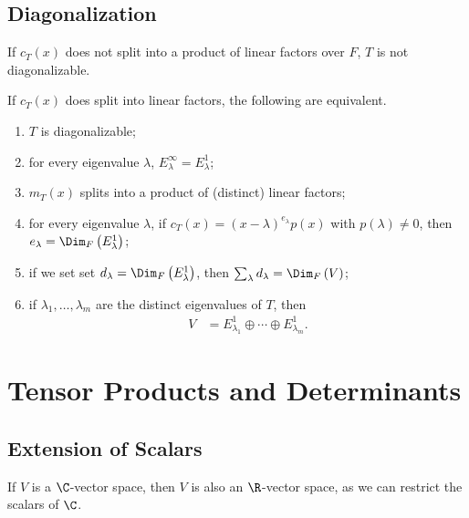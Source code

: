 \documentclass[10pt]{mypackage}
\begin{document}
\subsection{Diagonalization}%
\begin{theorem}
  If $c_T(x)$ does not split into a product of linear factors over $F$, $T$ is not diagonalizable.\newline

  If $c_T(x)$ does split into linear factors, the following are equivalent.
  \begin{enumerate}[(1)]
    \item $T$ is diagonalizable;
    \item for every eigenvalue $\lambda$, $E_{\lambda}^{\infty} = E_{\lambda}^{1}$;
    \item $m_{T}(x)$ splits into a product of (distinct) linear factors;
    \item for every eigenvalue $\lambda$, if $c_T(x) = \left(x-\lambda\right)^{e_{\lambda}}p(x)$ with $p\left(\lambda\right)\neq 0$, then $e_{\lambda} = \Dim_{F}\left(E_{\lambda}^{1}\right)$;
    \item if we set set $d_{\lambda} = \Dim_{F}\left(E_{\lambda}^{1}\right)$, then $\sum_{\lambda} d_{\lambda} = \Dim_{F}\left(V\right)$;
    \item if $\lambda_1,\dots,\lambda_m$ are the distinct eigenvalues of $T$, then
      \begin{align*}
        V &= E_{\lambda_1}^{1}\oplus\cdots\oplus E_{\lambda_m}^{1}.
      \end{align*}
  \end{enumerate}
\end{theorem}
\section{Tensor Products and Determinants}%
\subsection{Extension of Scalars}%
If $V$ is a $\C$-vector space, then $V$ is also an $\R$-vector space, as we can restrict the scalars of $\C$.\newline
\end{document}

